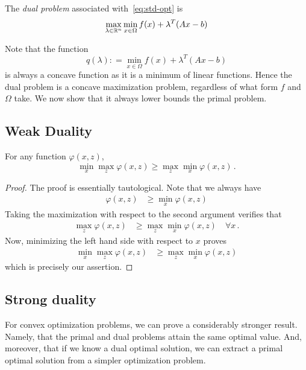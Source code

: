  The \emph{dual problem} associated with~\eqref{eq:std-opt} is
 \[
 \max_{\lambda \in \mathbb{R}^n} \min_{x \in \Omega} f(x) + \lambda^T(Ax-b)
\]

Note that the function
\[
	q(\lambda): =  \min_{x \in \Omega} f(x) + \lambda^T(Ax-b)
\]
is always a concave function as it is a minimum of linear functions.  Hence the dual problem is a concave maximization problem, regardless of what form $f$ and $\Omega$ take.  We now show that it always lower bounds the primal problem. 

\subsection{Weak Duality}
  
\begin{proposition}
For any function $\varphi(x,z)$,
\[
 \min_x \max_z \varphi(x,z) \geq \max_z \min_x \varphi(x,z)\,.
 \]
\end{proposition}
\begin{proof}
The proof is essentially tautological.  Note that we always have
\begin{align*}
\varphi(x,z) &\geq \min_x \varphi(x,z)
\end{align*}
Taking the maximization with respect to the second argument verifies that
\begin{align*}
\max_z \varphi(x,z) &\geq \max_z \min_x \varphi(x,z) \quad \forall x\,.
\end{align*}
Now, minimizing the left hand side with respect to $x$ proves
\begin{align*}
\min_x \max_z\varphi(x,z) &\geq \max_z \min_x \varphi(x,z)
\end{align*}
which is precisely our assertion.
\end{proof}

\subsection{Strong duality}

For convex optimization problems, we can prove a considerably stronger result.  Namely, that the primal and dual problems attain the same optimal value.  And, moreover, that if we know a dual optimal solution, we can extract a primal optimal solution from a simpler optimization problem.

